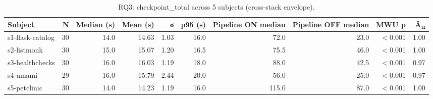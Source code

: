 \begin{table}[htbp]
\centering
\small
\caption{RQ3: checkpoint_total across 5 subjects (cross-stack envelope).}
\label{tab:rq3-cross}
\begin{tabular}{lrrrrrrrrr}
\toprule
\textbf{Subject} & \textbf{N} & \textbf{Median (s)} & \textbf{Mean (s)} & \textbf{σ} & \textbf{p95 (s)} & \textbf{Pipeline ON median} & \textbf{Pipeline OFF median} & \textbf{MWU p} & \textbf{Â₁₂} \\
\midrule
s1-flask-catalog & 30 & 14.0 & 14.63 & 1.03 & 16.0 & 72.0 & 23.0 & $<$0.001 & 1.00 \\
s2-listmonk & 30 & 15.0 & 15.07 & 1.20 & 16.5 & 75.5 & 46.0 & $<$0.001 & 1.00 \\
s3-healthchecks & 30 & 16.0 & 16.03 & 1.19 & 18.0 & 88.0 & 42.5 & $<$0.001 & 0.97 \\
s4-umami & 29 & 16.0 & 15.79 & 2.44 & 20.0 & 56.0 & 25.0 & $<$0.001 & 0.97 \\
s5-petclinic & 30 & 14.0 & 14.23 & 1.19 & 16.0 & 115.0 & 87.0 & $<$0.001 & 1.00 \\
\bottomrule
\end{tabular}
\end{table}